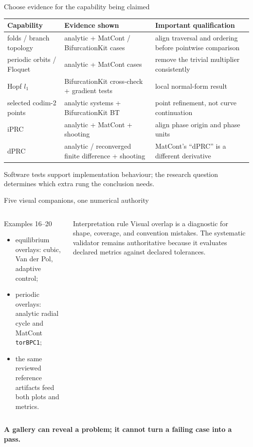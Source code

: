 \begin{frame}{Choose evidence for the capability being claimed}
\scriptsize
\centering
\renewcommand{\arraystretch}{1.25}
\setlength{\tabcolsep}{3pt}
\begin{tabular}{@{}>{\raggedright\arraybackslash}p{}
                  >{\raggedright\arraybackslash}p{}
                  >{\raggedright\arraybackslash}p{}@{}}
\toprule
Capability & Evidence shown & Important qualification\\
\midrule
folds / branch topology
  & analytic + MatCont / BifurcationKit cases
  & align traversal and ordering before pointwise comparison\\
periodic orbits / Floquet
  & analytic + MatCont cases
  & remove the trivial multiplier consistently\\
Hopf $l_1$
  & BifurcationKit cross-check + gradient tests
  & local normal-form result\\
selected codim-2 points
  & analytic systems + BifurcationKit BT
  & point refinement, not curve continuation\\
iPRC
  & analytic + MatCont + shooting
  & align phase origin and phase units\\
dPRC
  & analytic / reconverged finite difference + shooting
  & MatCont's ``dPRC'' is a different derivative\\
\bottomrule
\end{tabular}
\vspace{2mm}

{\small Software tests support implementation behaviour; the research question determines which extra rung the conclusion needs.}
\end{frame}

\begin{frame}{Five visual companions, one numerical authority}
\small
\begin{columns}[T,onlytextwidth]
\begin{block}{Examples 16--20}
\begin{itemize}
  \item equilibrium overlays: cubic, Van der Pol, adaptive control;
  \item periodic overlays: analytic radial cycle and MatCont \texttt{torBPC1};
  \item the same reviewed reference artifacts feed both plots and metrics.
\end{itemize}
\end{block}
\begin{alertblock}{Interpretation rule}
Visual overlap is a diagnostic for shape, coverage, and convention mistakes.
The systematic validator remains authoritative because it evaluates declared
metrics against declared tolerances.
\end{alertblock}
\end{columns}
\vfill
\centering
\textbf{A gallery can reveal a problem; it cannot turn a failing case into a pass.}
\end{frame}

